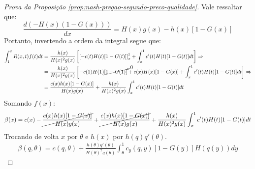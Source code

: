 \begin{proof}[Prova da Proposição \ref{prop:nash-pregao-segundo-preco-qualidade}]
	Vale ressaltar que:
	\begin{equation*}
		\frac{d(-H(x)(1-G(x)))}{dx} =  H(x)g(x)-h(x)[1-G(x)]
	\end{equation*}
	Portanto, invertendo a ordem da integral segue que:
	\begin{align*}
		\int_1^x R(x,t)f(t)dt & = \frac{h(x)}{H(x)^2g(x)} \left[ \left[ -c(t)H(t)[1-G(t)] \right]_x^1  + \int_x^1  c'(t)H(t)[1-G(t)] dt \right] \Rightarrow \\
		& = \frac{h(x)}{H(x)^2g(x)} \left[ -c(1)H(1)\cancelto{0}{[1-G(1)]} + c(x)H(x)[1-G(x)] + \int_x^1  c'(t)H(t)[1-G(t)] dt \right] \Rightarrow \\
		& = \frac{c(x)h(x)[1-G(x)]}{H(x)g(x)} + \frac{h(x)}{H(x)^2g(x)} \int_x^1  c'(t)H(t)[1-G(t)] dt
	\end{align*}
	Somando $f(x)$:
	\begin{align*}
		\beta(x) = c(x) - \cancel{\frac{c(x)h(x)[1-G(x)]}{H(x)g(x)}} + \cancel{\frac{c(x)h(x)[1-G(x)]}{H(x)g(x)}} + \frac{h(x)}{H(x)^2g(x)} \int_x^1  c'(t)H(t)[1-G(t)] dt
	\end{align*}
	Trocando de volta $x$ por $\theta$ e $h(x)$ por $h(q)q'(\theta)$.
	\begin{align*}
		\beta(q, \theta) = c(q, \theta) + \frac{h(\theta)q'(\theta)}{H(\theta)^2g(\theta)} \int_{\theta}^1 c_y(q, y)[1-G(y)]H(q(y))dy
	\end{align*}
\end{proof}